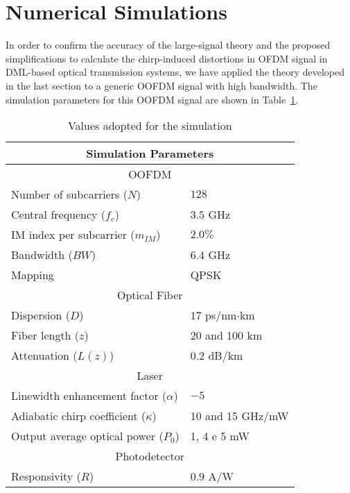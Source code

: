 \documentclass[journal]{IEEEtran}
\begin{document}
\section{Numerical Simulations} \label{sec:results}
In order to confirm the accuracy of the large-signal theory and the proposed simplifications to calculate the chirp-induced distortions in OFDM signal in DML-based optical transmission systems, we have applied the theory developed in the last section to a generic OOFDM signal with high bandwidth. The simulation parameters for this OOFDM signal are shown in Table~\ref{tab:ofdmgen}.

\begin{table}[hbt]
\centering
\begin{tabular}{l|l}
\hline
\multicolumn{2}{c}{Simulation Parameters} \\
\cline{1-2}
\hline
\multicolumn{2}{c}{OOFDM} \\
\cline{1-2}
\hline
Number of subcarriers ($N$)  									   & $128$    \\
Central frequency ($f_c$)												 & $3.5$ GHz \\
IM index per subcarrier ($m_{IM}$)   		   & $2.0\%$     \\
Bandwidth ($BW$)														 & 6.4 GHz \\
Mapping															 & QPSK \\
\hline
\multicolumn{2}{c}{Optical Fiber} \\
\cline{1-2}
\hline
Dispersion ($D$)  																	 & $17$ ps/nm$\cdot$km    \\
Fiber length ($z$)        									  			 & 20 and 100 km		   \\
Attenuation ($L(z)$)																 & 0.2 dB/km \\
\hline
\multicolumn{2}{c}{Laser} \\
\cline{1-2}
\hline
Linewidth enhancement factor ($\alpha$)&  $-5$   \\
Adiabatic chirp coefficient ($\kappa$)  & 	10 and 15 GHz/mW     \\
Output average optical power ($P_0$)								 &  1, 4 e 5 mW \\
\hline
\multicolumn{2}{c}{Photodetector} \\
\cline{1-2}
\hline
Responsivity ($R$)															 & $0.9$ A/W \\
\hline
\end{tabular}
\caption{Values adopted for the simulation}
\label{tab:ofdmgen}
\end{table}
\end{document}
